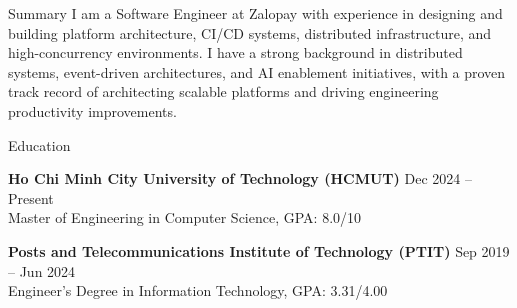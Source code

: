 \documentclass{resume} %
\begin{document}

\begin{rSection}{Summary}
    I am a Software Engineer at Zalopay with experience in designing and building platform architecture, CI/CD systems, distributed infrastructure, and high-concurrency environments. I have a strong background in distributed systems, event-driven architectures, and AI enablement initiatives, with a proven track record of architecting scalable platforms and driving engineering productivity improvements.
\end{rSection}


\begin{rSection}{Education}

    {\bf Ho Chi Minh City University of Technology (HCMUT)} \hfill {Dec 2024 -- Present}
    \\
    Master of Engineering in Computer Science, GPA: 8.0/10

    {\bf Posts and Telecommunications Institute of Technology (PTIT)} \hfill {Sep 2019 -- Jun 2024}
    \\
    Engineer's Degree in Information Technology, GPA: 3.31/4.00

\end{rSection}

\end{document}

